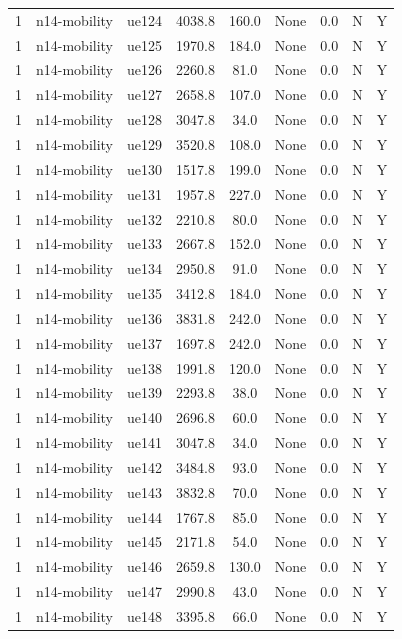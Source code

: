 \begin{table}[ht]
\begin{tabular}{|c|c|c|c|c|c|c|c|c|}
1 & n14-mobility & ue124 & 4038.8 & 160.0 & None & 0.0 & N & Y \\
1 & n14-mobility & ue125 & 1970.8 & 184.0 & None & 0.0 & N & Y \\
1 & n14-mobility & ue126 & 2260.8 & 81.0 & None & 0.0 & N & Y \\
1 & n14-mobility & ue127 & 2658.8 & 107.0 & None & 0.0 & N & Y \\
1 & n14-mobility & ue128 & 3047.8 & 34.0 & None & 0.0 & N & Y \\
1 & n14-mobility & ue129 & 3520.8 & 108.0 & None & 0.0 & N & Y \\
1 & n14-mobility & ue130 & 1517.8 & 199.0 & None & 0.0 & N & Y \\
1 & n14-mobility & ue131 & 1957.8 & 227.0 & None & 0.0 & N & Y \\
1 & n14-mobility & ue132 & 2210.8 & 80.0 & None & 0.0 & N & Y \\
1 & n14-mobility & ue133 & 2667.8 & 152.0 & None & 0.0 & N & Y \\
1 & n14-mobility & ue134 & 2950.8 & 91.0 & None & 0.0 & N & Y \\
1 & n14-mobility & ue135 & 3412.8 & 184.0 & None & 0.0 & N & Y \\
1 & n14-mobility & ue136 & 3831.8 & 242.0 & None & 0.0 & N & Y \\
1 & n14-mobility & ue137 & 1697.8 & 242.0 & None & 0.0 & N & Y \\
1 & n14-mobility & ue138 & 1991.8 & 120.0 & None & 0.0 & N & Y \\
1 & n14-mobility & ue139 & 2293.8 & 38.0 & None & 0.0 & N & Y \\
1 & n14-mobility & ue140 & 2696.8 & 60.0 & None & 0.0 & N & Y \\
1 & n14-mobility & ue141 & 3047.8 & 34.0 & None & 0.0 & N & Y \\
1 & n14-mobility & ue142 & 3484.8 & 93.0 & None & 0.0 & N & Y \\
1 & n14-mobility & ue143 & 3832.8 & 70.0 & None & 0.0 & N & Y \\
1 & n14-mobility & ue144 & 1767.8 & 85.0 & None & 0.0 & N & Y \\
1 & n14-mobility & ue145 & 2171.8 & 54.0 & None & 0.0 & N & Y \\
1 & n14-mobility & ue146 & 2659.8 & 130.0 & None & 0.0 & N & Y \\
1 & n14-mobility & ue147 & 2990.8 & 43.0 & None & 0.0 & N & Y \\
1 & n14-mobility & ue148 & 3395.8 & 66.0 & None & 0.0 & N & Y \\

\end{tabular}
\end{table}
